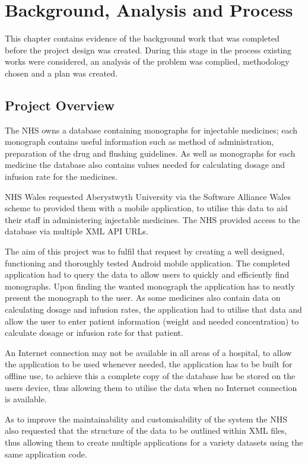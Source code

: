 \chapter{Background, Analysis and Process}

This chapter contains evidence of the background work that was completed before the project design was created. During this stage in the process existing works were considered, an analysis of the problem was complied, methodology chosen and a plan was created.

\section{Project Overview}
The NHS \cite{nhs_website} owns a database containing monographs \cite{monograph} for injectable medicines; each monograph contains useful information such as method of administration, preparation of the drug and flushing guidelines. As well as monographs for each medicine the database also contains values needed for calculating dosage and infusion rate for the medicines.

NHS Wales \cite{nhs_website} requested Aberystwyth University via the Software Alliance Wales scheme \cite{software_al} to provided them with a mobile application, to utilise this data to aid their staff in administering injectable medicines. The NHS provided access to the database via multiple XML \cite{xml} API URLs. 

The aim of this project was to fulfil that request by creating a well designed, functioning and thoroughly tested Android \cite{android} mobile application. The completed application had to query the data to allow users to quickly and efficiently find monographs. Upon finding the wanted monograph the application has to neatly present the monograph to the user. As some medicines also contain data on calculating dosage and infusion rates, the application had to utilise that data and allow the user to enter patient information (weight and needed concentration) to calculate dosage or infusion rate for that patient.

An Internet connection may not be available \cite{mobile_inter} in all areas of a hospital, to allow the application to be used whenever needed, the application has to be built for offline use, to achieve this a complete copy of the database has be stored on the users device, thus allowing them to utilise the data when no Internet connection is available.

As to improve the maintainability and customisability of the system the NHS also requested that the structure of the data to be outlined within XML \cite{xml} files, thus allowing them to create multiple applications for a variety datasets using the same application code.

